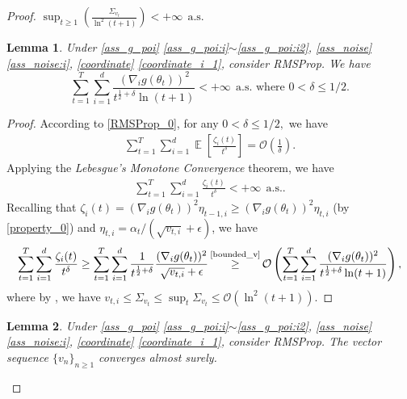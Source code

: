 \documentclass[standalone]{article}
\newtheorem{lem}{Lemma}[section]
\DeclareMathOperator{\Expect}{\mathbb{E}}
\begin{document}
\begin{proof}
$\sup_{t\ge 1}\left(\frac{\Sigma_{v_{t}}}{\ln^{2}(t+1)}\right)<+\infty\ \ \text{a.s.}$
\begin{lem}\label{RMSProp_9}
    Under \cref{ass_g_poi} \ref{ass_g_poi:i}$\sim$\ref{ass_g_poi:i2}, \cref{ass_noise} \ref{ass_noise:i}, \cref{coordinate} \ref{coordinate_i_1}, consider RMSProp. We have
\[\sum_{t=1}^{T}\sum_{i=1}^{d}\frac{(\nabla_{i}g(\theta_{t}))^{2}}{t^{\frac{1}{2}+\delta}\ln(t+1)}<+\infty\ \ \text{a.s.} \,\, \text{where} \,\,  0<\delta\le 1/2. \]
\end{lem}
\begin{proof}
According to  \cref{RMSProp_0}, for any $0<\delta\le 1/2,$ we have 
\begin{align*}
\sum_{t=1}^{T}\sum_{i=1}^{d}\Expect\left[\frac{\zeta_{i}(t)}{t^{\delta}}\right]=\mathcal{O}\left(\frac{1}{\delta}\right) .  
\end{align*}
Applying the \emph{Lebesgue's Monotone Convergence} theorem, we have
\begin{align*}
\sum_{t=1}^{T}\sum_{i=1}^{d}\frac{\zeta_{i}(t)}{t^{\delta}}<+\infty\ \ \text{a.s.}.  \end{align*}
Recalling that $\zeta_{i}(t) = (\nabla_i g(\theta_t))^2 \eta_{t-1,i} \geq (\nabla_i g(\theta_t))^2 \eta_{t,i}$ (by \cref{property_0}) and $\eta_{t,i} = \alpha_t / (\sqrt{v_{t,i}} + \epsilon)$, we have
\begin{align*}
\sum_{t=1}^{T}\sum_{i=1}^{d}\frac{\zeta_{i}(t)}{t^{\delta}} \geq  \sum_{t=1}^{T}\sum_{i=1}^{d}\frac{1}{t^{\frac{1}{2}+\delta}}\frac{(\nabla_{i}g(\theta_{t}))^{2}}{\sqrt{v_{t,i}}+\epsilon}\mathop{\ge}^{\text{\cref{bounded_v}}}\mathcal{O}\left( \sum_{t=1}^{T}\sum_{i=1}^{d}\frac{(\nabla_{i}g(\theta_{t}))^{2}}{t^{\frac{1}{2}+\delta}\ln(t+1)}\right)  ,
\end{align*}
where by , we have $v_{t,i} \leq \Sigma_{v_t} \leq \sup_{t} \Sigma_{v_t} \leq \mathcal{O}(\ln^2(t+1)) $.
\end{proof}
\begin{lem}\label{convergence_v}
   Under \cref{ass_g_poi} \ref{ass_g_poi:i}$\sim$\ref{ass_g_poi:i2}, \cref{ass_noise} \ref{ass_noise:i}, \cref{coordinate} \ref{coordinate_i_1}, consider RMSProp. The vector sequence \(\{v_{n}\}_{n \geq 1}\) converges almost surely.

\end{lem}
\end{proof}
\end{document}
